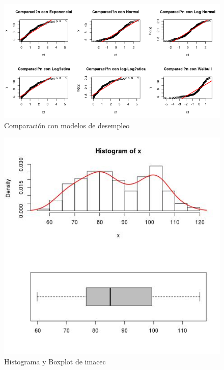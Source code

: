 \documentclass{article}
\begin{document}
\begin{figure}[h!]
\centering
\includegraphics[scale=0.5]{./plots/cm_desempleo.png}
\caption{Comparación con modelos de desempleo}
\end{figure}
\pagebreak
\begin{figure}[h!]
\centering
\includegraphics[scale=0.5]{./plots/histplot_imacec.png}
\caption{Histograma y Boxplot de imacec}
\end{figure}
\end{document}
